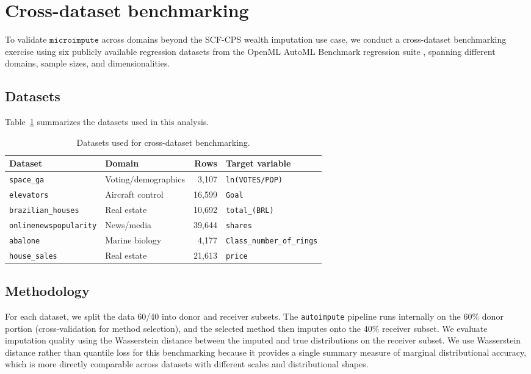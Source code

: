 \section{Cross-dataset benchmarking}\label{app:benchmarking}

To validate $\texttt{microimpute}$ across domains beyond the SCF-CPS wealth imputation use case, we conduct a cross-dataset benchmarking exercise using six publicly available regression datasets from the OpenML AutoML Benchmark regression suite \citep{vanschoren2014openml}, spanning different domains, sample sizes, and dimensionalities.

\subsection{Datasets}

Table~\ref{tab:benchmark_datasets} summarizes the datasets used in this analysis.

\begin{table}[H]
    \centering
    \caption{Datasets used for cross-dataset benchmarking.}
    \label{tab:benchmark_datasets}
    \begin{tabular}{llrl}
        \toprule
        Dataset & Domain & Rows & Target variable \\
        \midrule
        \texttt{space\_ga} & Voting/demographics & 3,107 & \texttt{ln(VOTES/POP)} \\
        \texttt{elevators} & Aircraft control & 16,599 & \texttt{Goal} \\
        \texttt{brazilian\_houses} & Real estate & 10,692 & \texttt{total\_(BRL)} \\
        \texttt{onlinenewspopularity} & News/media & 39,644 & \texttt{shares} \\
        \texttt{abalone} & Marine biology & 4,177 & \texttt{Class\_number\_of\_rings} \\
        \texttt{house\_sales} & Real estate & 21,613 & \texttt{price} \\
        \bottomrule
    \end{tabular}
\end{table}

\subsection{Methodology}

For each dataset, we split the data 60/40 into donor and receiver subsets. The \texttt{autoimpute} pipeline runs internally on the 60\% donor portion (cross-validation for method selection), and the selected method then imputes onto the 40\% receiver subset. We evaluate imputation quality using the Wasserstein distance between the imputed and true distributions on the receiver subset. We use Wasserstein distance rather than quantile loss for this benchmarking because it provides a single summary measure of marginal distributional accuracy, which is more directly comparable across datasets with different scales and distributional shapes.


